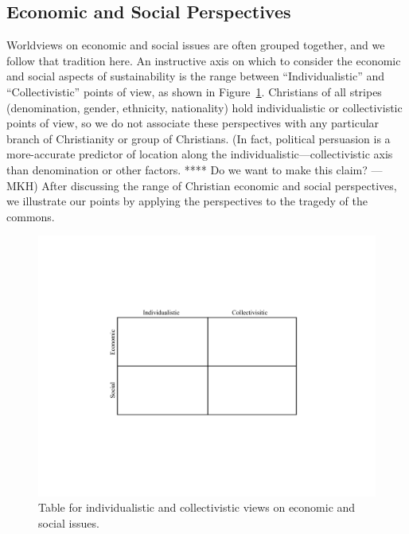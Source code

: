 \documentclass[12pt]{article}
\begin{document}
\subsection{Economic and Social Perspectives}
\label{sec:economic_and_social}

Worldviews on economic and social issues are often grouped together, and
we follow that tradition here. 
An instructive axis on which to consider the economic and social aspects of sustainability
is the range between ``Individualistic'' and ``Collectivistic'' points of view, 
as shown in Figure~\ref{fig:table}.
Christians of all stripes (denomination, gender, ethnicity, nationality)
hold individualistic or collectivistic points of view, 
so we do not associate these perspectives with any particular branch of Christianity
or group of Christians.
(In fact, political persuasion is a more-accurate predictor of location along the 
individualistic---collectivistic axis than denomination or other factors.
**** Do we want to make this claim? ---MKH)
After discussing the range of Christian economic and social perspectives,
we illustrate our points by applying the perspectives to the 
tragedy of the commons. 

\begin{figure}
\centering
\includegraphics[width=0.75\linewidth]{figure_other/QuadTable}
\caption{Table for individualistic and collectivistic views on economic and social issues.}
\label{fig:table}
\end{figure}
\end{document}
